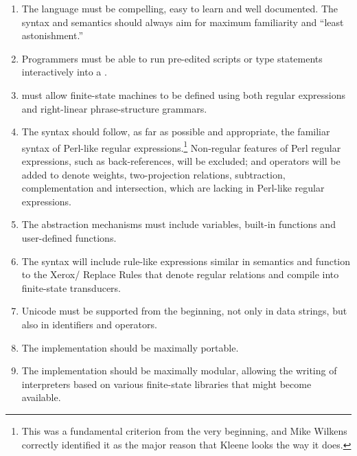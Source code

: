 \begin{enumerate}

\item
The \Kleene{} language must be compelling, easy to learn and well documented.  
The syntax and semantics should always aim for maximum
familiarity and ``least astonishment.''

\item
Programmers must be able to run pre-edited scripts or
type statements interactively into a .

\item
\Kleene{} must allow finite-state machines to be defined using 
both regular expressions and right-linear
phrase-structure grammars. 

\item
The syntax should follow, as far as
possible and appropriate, the familiar syntax of Perl-like regular
expressions.\footnote{This was a fundamental criterion from the
very beginning, and Mike Wilkens correctly identified it
as the major reason that Kleene looks the way it does.}  Non-regular features of Perl regular expressions, 
such as back-references, will be
excluded; and operators will be added to denote weights,
two-projection relations, subtraction, complementation and intersection, which are
lacking in Perl-like regular expressions.

\item
The abstraction mechanisms must include variables, built-in functions
and user-defined functions.


\item
The syntax will include rule-like expressions similar in semantics and 
function to the
Xerox/ Replace Rules
\citep{karttunen:1995,karttunen+kempe:1995,karttunen:1996,kempe+karttunen:1996,mohri+sproat:1996} that denote regular relations and
compile into finite-state transducers.  

\item
Unicode must be supported from the beginning, not only in data
strings, but also in \Kleene{} identifiers and operators.

\item
The implementation should be maximally portable.

\item
The implementation should be maximally modular, allowing the writing of
interpreters based on various finite-state libraries that might become
available.
\end{enumerate}

